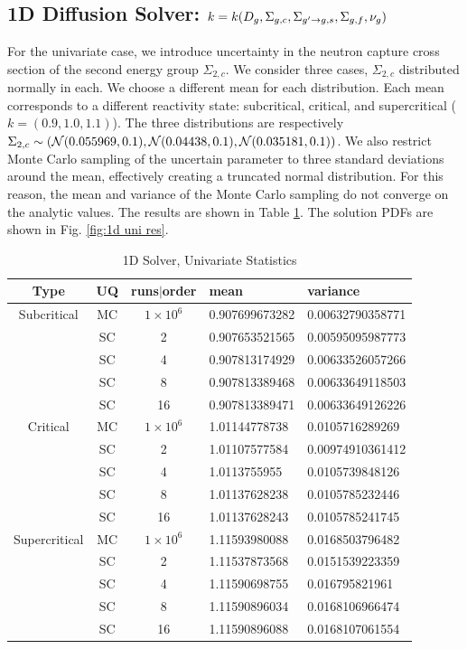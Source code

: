 \subsection{1D Diffusion Solver: $k=k\qty(D_g,\Sigma_{g,c},\Sigma_{g'\to g,s},\Sigma_{g,f},\nu_g)$}
For the univariate case, we introduce uncertainty in the neutron capture cross section of the second energy group $\Sigma_{2,c}$.   We consider three cases, $\Sigma_{2,c}$ distributed normally in each.  We choose a different mean for each distribution.  Each mean corresponds to a different reactivity state: subcritical, critical, and supercritical ($k=(0.9,1.0,1.1)$).  The three distributions are respectively $\Sigma_{2,c}\sim\qty(\mathcal{N}(0.055969,0.1),\mathcal{N}(0.04438,0.1),\mathcal{N}(0.035181,0.1))$.  We also restrict Monte Carlo sampling of the uncertain parameter to three standard deviations around the mean, effectively creating a truncated normal distribution.  For this reason, the mean and variance of the Monte Carlo sampling do not converge on the analytic values.  The results are shown in Table \ref{tab: 1d uni res}.  The solution PDFs are shown in Fig. \ref{fig:1d uni res}.
\begin{table}[H]
\begin{center}
\begin{tabular}{c|c c|l l}
Type & UQ & runs$|$order & mean & variance \\ \hline
Subcritical & MC & $1\times10^6$ & 0.907699673282 & 0.00632790358771 \\
&SC & 2 & 0.907653521565 & 0.00595095987773 \\
&SC & 4 & 0.907813174929 & 0.00633526057266\\
&SC & 8 & 0.907813389468 & 0.00633649118503 \\
&SC & 16 & 0.907813389471 & 0.00633649126226 \\ \hline
Critical &MC & $1\times10^6$ & 1.01144778738 & 0.0105716289269   \\
&SC & 2 & 1.01107577584 & 0.00974910361412  \\
&SC & 4 & 1.0113755955 & 0.0105739848126 \\
&SC & 8 & 1.01137628238 & 0.0105785232446 \\
&SC & 16 & 1.01137628243 & 0.0105785241745 \\ \hline
Supercritical & MC & $1\times10^6$ & 1.11593980088 & 0.0168503796482 \\
&SC & 2 & 1.11537873568 & 0.0151539223359 \\
&SC & 4 & 1.11590698755 & 0.016795821961\\
&SC & 8 & 1.11590896034 & 0.0168106966474 \\
&SC & 16 & 1.11590896088 & 0.0168107061554
\end{tabular}
\end{center}
\caption{1D Solver, Univariate Statistics}
\label{tab: 1d uni res}
\end{table}

